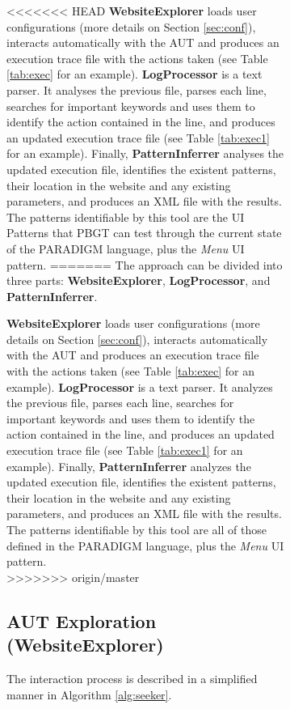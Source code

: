 \documentclass[conference]{IEEEtran}
\begin{document}
\begin{enumerate}
\begin{figure}[!htb]
\begin{itemize}
\begin{figure}[!htb]
<<<<<<< HEAD
\textbf{WebsiteExplorer} loads user configurations (more details on Section \ref{sec:conf}), interacts automatically with the AUT and produces an execution trace file with the actions taken (see Table \ref{tab:exec} for an example). \textbf{LogProcessor} is a text parser. It analyses the previous file, parses each line, searches for important keywords and uses them to identify the action contained in the line, and produces an updated execution trace file (see Table \ref{tab:exec1} for an example). Finally, \textbf{PatternInferrer} analyses the updated execution file, identifies the existent patterns, their location in the website and any existing parameters, and produces an XML file with the results. The patterns identifiable by this tool are the UI Patterns that PBGT can test through the current state of the PARADIGM language, plus the \textit{Menu} UI pattern. 
=======
The approach can be divided into three parts: \textbf{WebsiteExplorer}, \textbf{LogProcessor}, and \textbf{PatternInferrer}.

\textbf{WebsiteExplorer} loads user configurations (more details on Section \ref{sec:conf}), interacts automatically with the AUT and produces an execution trace file with the actions taken (see Table \ref{tab:exec} for an example). \textbf{LogProcessor} is a text parser. It analyzes the previous file, parses each line, searches for important keywords and uses them to identify the action contained in the line, and produces an updated execution trace file (see Table \ref{tab:exec1} for an example). Finally, \textbf{PatternInferrer} analyzes the updated execution file, identifies the existent patterns, their location in the website and any existing parameters, and produces an XML file with the results. The patterns identifiable by this tool are all of those defined in the PARADIGM language, plus the \textit{Menu} UI pattern. \\
>>>>>>> origin/master

\subsection{AUT Exploration (WebsiteExplorer)}\label{sec:inter}
The interaction process is described in a simplified manner in Algorithm \ref{alg:seeker}.

\begin{algorithm}
  

\end{algorithm}
\end{figure}
\end{itemize}
\end{figure}
\end{enumerate}
\end{document}
